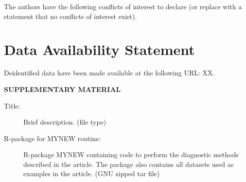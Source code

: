 \documentclass[
  12pt]{article}
\begin{document}
The authors have the following conflicts of interest to declare (or
replace with a statement that no conflicts of interest exist).

\section{Data Availability Statement}\label{data-availability-statement}

Deidentified data have been made available at the following URL: XX.

\label{supplementary-material}
\bigskip

\begin{center}

{\large\bf SUPPLEMENTARY MATERIAL}

\end{center}

\begin{description}
\item[Title:]
Brief description. (file type)
\item[R-package for MYNEW routine:]
R-package MYNEW containing code to perform the diagnostic methods
described in the article. The package also contains all datasets used as
examples in the article. (GNU zipped tar file)
\end{description}


  
\end{document}
